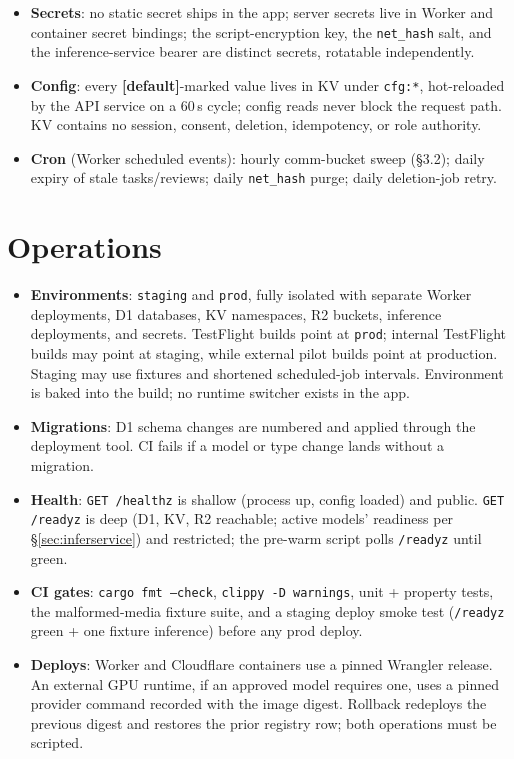 \documentclass[11pt]{article}
\newcommand{\code}[1]{\texttt{#1}}
\begin{document}
\begin{itemize}[nosep]
  \item \textbf{Secrets}: no static secret ships in the app; server secrets live in
        Worker and container secret bindings; the script-encryption key, the
        \code{net\_hash} salt, and the inference-service bearer are distinct
        secrets, rotatable independently.
  \item \textbf{Config}: every \textbf{[default]}-marked value lives in KV under
        \code{cfg:*}, hot-reloaded by the API service on a 60\,s cycle; config
        reads never block the request path. KV contains no session, consent,
        deletion, idempotency, or role authority.
  \item \textbf{Cron} (Worker scheduled events): hourly comm-bucket sweep
        (\S3.2); daily expiry of stale tasks/reviews; daily \code{net\_hash} purge;
        daily deletion-job retry.
\end{itemize}

\section{Operations}

\begin{itemize}[nosep]
  \item \textbf{Environments}: \code{staging} and \code{prod}, fully isolated with
        separate Worker deployments, D1 databases, KV namespaces, R2 buckets,
        inference deployments, and secrets. TestFlight builds point at \code{prod};
        internal TestFlight builds may point at staging, while external pilot builds
        point at production. Staging may use fixtures and shortened scheduled-job
        intervals.
        Environment is baked into the build; no runtime switcher exists in the app.
  \item \textbf{Migrations}: D1 schema changes are numbered and applied through
        the deployment tool. CI fails if a model or type change lands without a
        migration.
  \item \textbf{Health}: \code{GET /healthz} is shallow (process up, config
        loaded) and public. \code{GET /readyz} is deep (D1, KV, R2 reachable;
        active models' readiness per \S\ref{sec:inferservice}) and restricted; the
        pre-warm script polls \code{/readyz} until green.
  \item \textbf{CI gates}: \code{cargo fmt --check}, \code{clippy -D warnings},
        unit + property tests, the malformed-media fixture suite, and a
        staging deploy smoke test (\code{/readyz} green + one fixture inference)
        before any prod deploy.
  \item \textbf{Deploys}: Worker and Cloudflare containers use a pinned Wrangler
        release. An external GPU runtime, if an approved model requires one, uses a
        pinned provider command recorded with the image digest. Rollback redeploys
        the previous digest and restores the prior registry row; both operations
        must be scripted.
\end{itemize}
\end{document}
